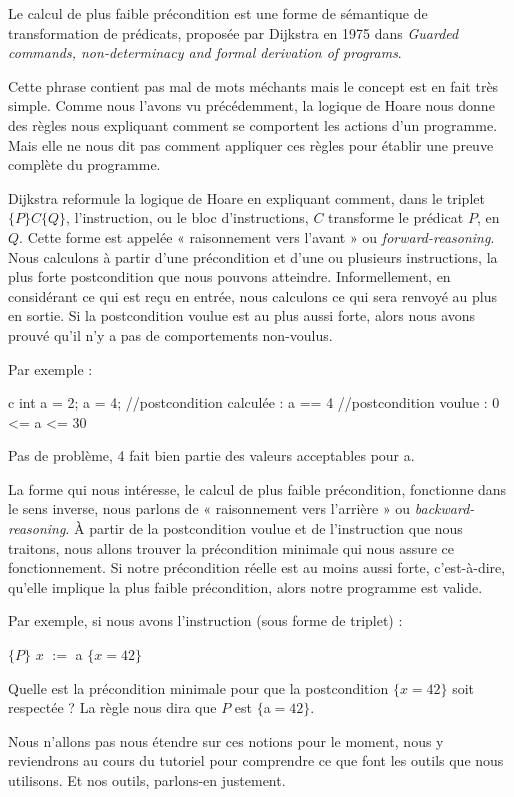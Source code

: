 

Le calcul de plus faible précondition est une forme de sémantique de 
transformation de prédicats, proposée par Dijkstra en 1975 dans \textit{Guarded 
commands, non-determinacy and formal derivation of programs}.



Cette phrase contient pas mal de mots méchants mais le concept est en fait très
simple. Comme nous l'avons vu précédemment, la logique de Hoare nous donne des
règles nous expliquant comment se comportent les actions d'un programme. Mais 
elle ne nous dit pas comment appliquer ces règles pour établir une preuve 
complète du programme.



Dijkstra reformule la logique de Hoare en expliquant comment, dans le triplet 
$\{P\}C\{Q\}$, l'instruction, ou le bloc d'instructions, $C$ transforme le 
prédicat $P$, en $Q$. Cette forme est appelée « raisonnement vers l'avant » ou 
\textit{forward-reasoning}. Nous calculons à partir d'une précondition et d'une ou 
plusieurs instructions, la plus forte postcondition que nous pouvons
atteindre. Informellement, en considérant ce qui est reçu en entrée, nous 
calculons ce qui sera renvoyé au plus en sortie. Si la postcondition voulue
est au plus aussi forte, alors nous avons prouvé qu'il n'y a pas de 
comportements non-voulus.



Par exemple :

\begin{CodeBlock}{c}
int a = 2;
a = 4;
//postcondition calculée : a == 4
//postcondition voulue   : 0 <= a <= 30
\end{CodeBlock}



Pas de problème, 4 fait bien partie des valeurs acceptables pour a.



La forme qui nous intéresse, le calcul de plus faible précondition, fonctionne
dans le sens inverse, nous parlons de « raisonnement vers l'arrière » ou 
\textit{backward-reasoning}. À partir de la postcondition voulue et de 
l'instruction que nous traitons, nous allons trouver la précondition minimale
qui nous assure ce fonctionnement. Si notre précondition réelle est au moins
aussi forte, c'est-à-dire, qu'elle implique la plus faible précondition, alors
notre programme est valide.



Par exemple, si nous avons l'instruction (sous forme de triplet) :



$\{P\}$ $x$ $:=$ a $\{x = 42\}$



Quelle est la précondition minimale pour que la postcondition $\{x = 42\}$ 
soit respectée ? La règle nous dira que $P$ est $\{$a$=42\}$.



Nous n'allons pas nous étendre sur ces notions pour le moment, nous y 
reviendrons au cours du tutoriel pour comprendre ce que font les outils que
nous utilisons. Et nos outils, parlons-en justement.
